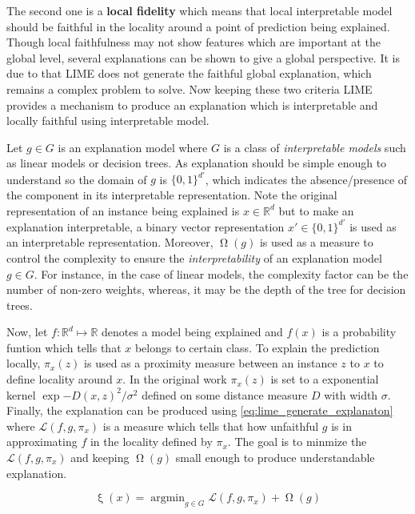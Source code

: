 \documentclass[english]{tktltiki2}
\theoremstyle{definition}
\theoremstyle{remark}
\DeclareMathOperator*{\argmin}{argmin}
\begin{document}
The second one is a \textbf{local fidelity} which means that local interpretable model should be faithful in the locality around a point of prediction being explained. Though local faithfulness may not show features which are important at the global level, several explanations can be shown to give a global perspective. It is due to that LIME does not generate the faithful global explanation, which remains a complex problem to solve. Now keeping these two criteria LIME \citep{ribeiro2016should} provides a mechanism to produce an explanation which is interpretable and locally faithful using interpretable model.

Let $g \in G$ is an explanation model where $G$ is a class of \textit{interpretable models} such as linear models or decision trees. As explanation should be simple enough to understand so the domain of  $g$ is $\{0, 1\}^{d'}$, which indicates the absence/presence of the component in its interpretable representation. Note the original representation of an instance being explained is $x \in \mathbb{R}^d$ but to make an explanation interpretable, a binary vector representation $x' \in \{0, 1\}^{d'}$ is used as an interpretable representation. Moreover, $\upOmega(g)$ is used as a measure to control the complexity to ensure the \textit{interpretability} of an explanation model $g \in G$. For instance, in the case of linear models, the complexity factor can be the number of non-zero weights, whereas, it may be the depth of the tree for decision trees.

Now, let $f: \mathbb{R}^d \mapsto \mathbb{R}$ denotes a model being explained and $f(x)$ is a probability funtion which tells that $x$ belongs to certain class. To explain the prediction locally, $\pi_x(z)$ is used as a proximity measure between an instance $z$ to $x$ to define locality around $x$. In the original work \citep{ribeiro2016should} $\pi_x(z)$ is set to a exponential kernel $\exp{-D(x,z)^2/\sigma^2}$ defined on some distance measure $D$ with width $\sigma$.
Finally, the explanation can be produced using \eqref{eq:lime_generate_explanaton} where $\mathcal{L}(f, g, \pi_x)$ is a measure which tells that how unfaithful $g$ is in approximating $f$ in the locality defined by $\pi_x$. The goal is to minmize the $\mathcal{L}(f, g, \pi_x)$ and keeping $\upOmega(g)$ small enough to produce understandable explanation.

\begin{equation}\label{eq:lime_generate_explanaton}
\mathsf{\upxi}(x) = \argmin_{g \in G} \mathcal{L}(f, g, \pi_x) + \upOmega(g)
\end{equation}
\end{document}
